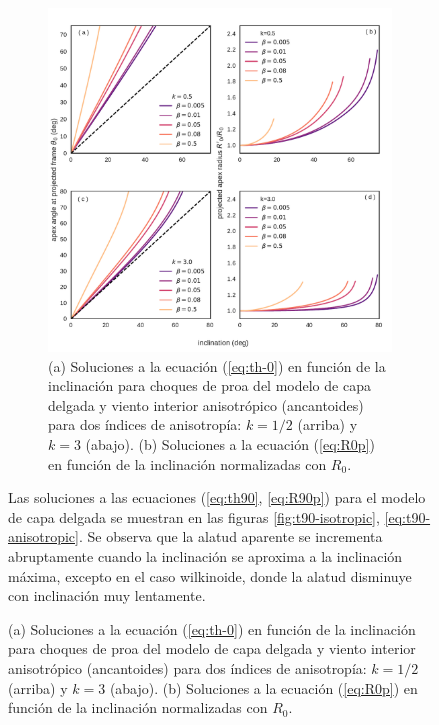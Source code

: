 \begin{figure}
\begin{figure}
  \includegraphics[width=\linewidth]{./Figures/ancantoid-th0-vs-i}
  \caption{(a) Soluciones a la ecuación (\ref{eq:th-0}) en función de la inclinación para choques de proa del modelo de capa delgada y viento interior anisotrópico (ancantoides) para dos índices de anisotropía: $k=1/2$ (arriba) y $k=3$ (abajo). (b) Soluciones a la ecuación (\ref{eq:R0p}) en función de la inclinación normalizadas con $R_0$.}
  \label{fig:th0-anisotropic}
\end{figure}

Las soluciones a las ecuaciones (\ref{eq:th90}, \ref{eq:R90p}) para el modelo de capa delgada se muestran en las figuras \ref{fig:t90-isotropic}, \ref{eq:t90-anisotropic}. Se observa que la alatud aparente se incrementa abruptamente cuando la inclinación se aproxima a la inclinación máxima, excepto en el caso wilkinoide, donde la alatud disminuye con inclinación muy lentamente.


\end{figure}
